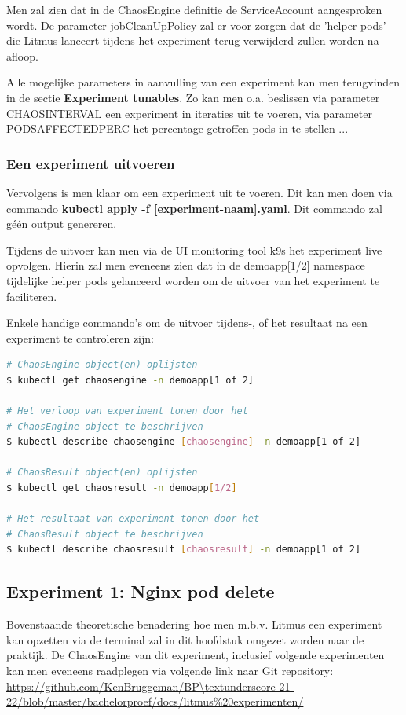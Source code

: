 Men zal zien dat in de ChaosEngine definitie de ServiceAccount aangesproken wordt. De parameter jobCleanUpPolicy zal er voor zorgen dat de 'helper pods' die Litmus lanceert tijdens het experiment terug verwijderd zullen worden na afloop.

Alle mogelijke parameters in aanvulling van een experiment kan men terugvinden in de sectie {\bf Experiment tunables}. Zo kan men o.a. beslissen via parameter CHAOS\textunderscore INTERVAL een experiment in iteraties uit te voeren, via parameter PODS\textunderscore AFFECTED\textunderscore PERC het percentage getroffen pods in te stellen ... 

\subsubsection{Een experiment uitvoeren}
\label{subsec:experimentuitvoeren}
Vervolgens is men klaar om een experiment uit te voeren. Dit kan men doen via commando {\bf kubectl apply -f [experiment-naam].yaml}. Dit commando zal géén output genereren. 

Tijdens de uitvoer kan men via de UI monitoring tool k9s het experiment live opvolgen. Hierin zal men eveneens zien dat in de demoapp[1/2] namespace tijdelijke helper pods gelanceerd worden om de uitvoer van het experiment te faciliteren. 

Enkele handige commando's om de uitvoer tijdens-, of het resultaat na een experiment te controleren zijn:
\begin{lstlisting}[language=bash]
# ChaosEngine object(en) oplijsten
$ kubectl get chaosengine -n demoapp[1 of 2]

# Het verloop van experiment tonen door het 
# ChaosEngine object te beschrijven
$ kubectl describe chaosengine [chaosengine] -n demoapp[1 of 2]

# ChaosResult object(en) oplijsten
$ kubectl get chaosresult -n demoapp[1/2]

# Het resultaat van experiment tonen door het 
# ChaosResult object te beschrijven
$ kubectl describe chaosresult [chaosresult] -n demoapp[1 of 2]
\end{lstlisting}

\subsection{Experiment 1: Nginx pod delete}

Bovenstaande theoretische benadering hoe men m.b.v. Litmus een experiment kan opzetten via de terminal zal in dit hoofdstuk omgezet worden naar de praktijk. De ChaosEngine van dit experiment, inclusief volgende experimenten kan men eveneens raadplegen via volgende link naar Git repository: \url{https://github.com/KenBruggeman/BP\textunderscore 21-22/blob/master/bachelorproef/docs/litmus%20experimenten/}

